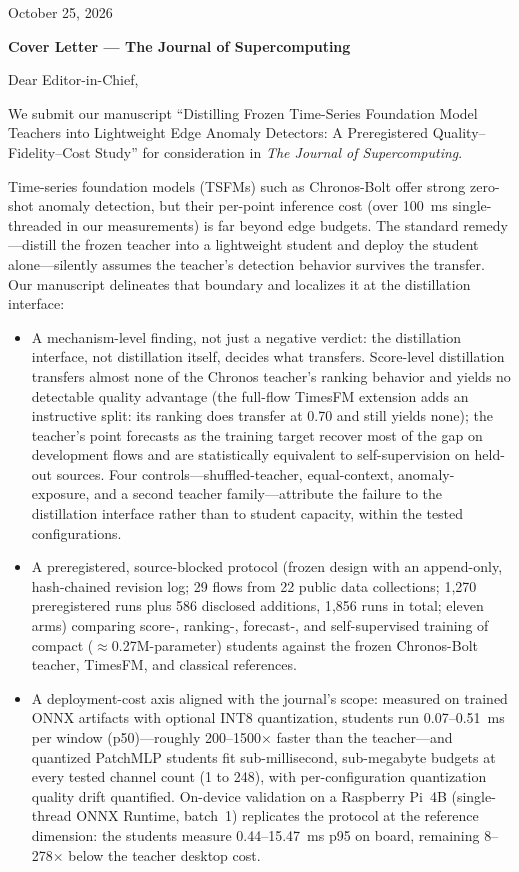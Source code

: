 \documentclass[10pt]{article}
\begin{document}
\begin{flushright}
October 25, 2026
\end{flushright}

\textbf{Cover Letter --- The Journal of Supercomputing}

Dear Editor-in-Chief,

We submit our manuscript ``Distilling Frozen Time-Series Foundation Model
Teachers into Lightweight Edge Anomaly Detectors: A Preregistered
Quality--Fidelity--Cost Study'' for consideration in \emph{The Journal of
Supercomputing}.

Time-series foundation models (TSFMs) such as Chronos-Bolt offer strong
zero-shot anomaly detection, but their per-point inference cost (over 100~ms
single-threaded in our measurements) is far beyond edge budgets. The standard
remedy---distill the frozen teacher into a lightweight student and deploy the
student alone---silently assumes the teacher's detection behavior survives the
transfer. Our manuscript delineates that boundary and localizes it at the
distillation interface:

\begin{itemize}
\item A mechanism-level finding, not just a negative verdict: the distillation
interface, not distillation itself, decides what transfers. Score-level
distillation transfers almost none of the Chronos teacher's ranking behavior
and yields no detectable quality advantage (the full-flow TimesFM extension
adds an instructive split: its ranking does transfer at 0.70 and still yields
none); the teacher's point forecasts as the training target recover most of
the gap on development flows and are statistically equivalent to
self-supervision on held-out sources. Four controls---shuffled-teacher,
equal-context, anomaly-exposure, and a second teacher family---attribute the
failure to the distillation interface rather than to student capacity, within
the tested configurations.
\item A preregistered, source-blocked protocol (frozen design with an
append-only, hash-chained revision log; 29 flows from 22 public data
collections; 1{,}270 preregistered runs plus 586 disclosed additions,
1{,}856 runs in total; eleven arms) comparing score-, ranking-, forecast-,
and self-supervised training of compact ($\approx$0.27M-parameter) students
against the frozen Chronos-Bolt teacher, TimesFM, and classical references.
\item A deployment-cost axis aligned with the journal's scope: measured on
trained ONNX artifacts with optional INT8 quantization, students run
0.07--0.51~ms per window (p50)---roughly 200--1500$\times$ faster than the
teacher---and quantized PatchMLP students fit sub-millisecond, sub-megabyte
budgets at every tested channel count (1 to 248), with per-configuration
quantization quality drift quantified. On-device validation on a Raspberry
Pi~4B (single-thread ONNX Runtime, batch~1) replicates the protocol at the
reference dimension: the students measure 0.44--15.47~ms p95 on board,
remaining 8--278$\times$ below the teacher desktop cost.
\end{itemize}
\end{document}
